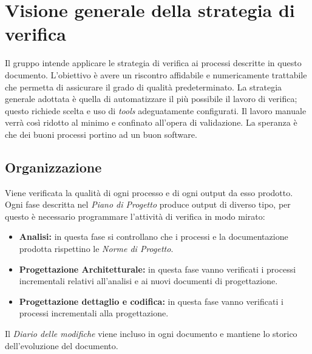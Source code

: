\clearpage
\section{Visione generale della strategia di verifica}
Il gruppo intende applicare le strategia di verifica ai processi descritte in questo documento. L'obiettivo è avere un riscontro affidabile e numericamente trattabile che permetta di assicurare il grado di qualità predeterminato. La strategia generale adottata è quella di automatizzare il più possibile il lavoro di verifica; questo richiede scelta e uso di \emph{tools} adeguatamente configurati. Il lavoro manuale verrà così ridotto al minimo e confinato all'opera di validazione.
La speranza è che dei buoni processi portino ad un buon software.
	
	\subsection{Organizzazione}
	Viene verificata la qualità di ogni processo e di ogni output da esso prodotto. Ogni fase  descritta nel \emph{Piano di Progetto} produce output di diverso tipo, per questo è necessario programmare l'attività di verifica in modo mirato:

	\begin{itemize}
		\item \textbf{Analisi:} in questa fase si controllano che i processi e la documentazione prodotta rispettino le \emph{Norme di Progetto}.
		\item \textbf{Progettazione Architetturale:} in questa fase vanno verificati i processi incrementali relativi all'analisi e ai nuovi documenti di progettazione.
		\item \textbf{Progettazione dettaglio e codifica:} in questa fase vanno verificati i processi incrementali alla progettazione.
	\end{itemize}
	
	Il \emph{Diario delle modifiche} viene incluso in ogni documento e mantiene lo storico dell'evoluzione del documento.
	
